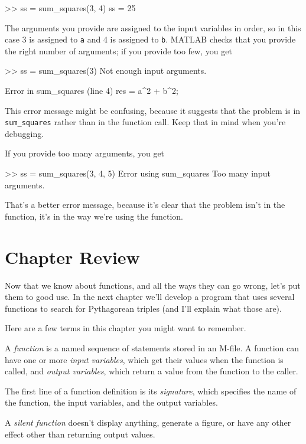 \begin{code}
>> ss = sum_squares(3, 4)
ss = 25
\end{code}

The arguments you provide are assigned to the input variables in
order, so in this case 3 is assigned to \lstinline{a} and 4 is assigned to
\lstinline{b}.  MATLAB checks that you provide the right number of arguments;
if you provide too few, you get

\begin{code}
>> ss = sum_squares(3)
Not enough input arguments.

Error in sum_squares (line 4)
    res = a^2 + b^2;
\end{code}

This error message might be confusing, because it suggests that
the problem is in \lstinline{sum_squares} rather than in the function call.
Keep that in mind when you're debugging.

If you provide too many arguments, you get

\begin{code}
>> ss = sum_squares(3, 4, 5)
Error using sum_squares
Too many input arguments.
\end{code}

That's a better error message, because it's clear that the problem isn't in the function, it's in the way we're using the function.

\section{Chapter Review}

Now that we know about functions, and all the ways they can go wrong, let's put them to good use.  In the next chapter we'll develop a program that uses several functions to search for Pythagorean triples (and I'll explain what those are).

Here are a few terms in this chapter you might want to remember.

A \emph{function} is a named sequence of statements stored in an M-file.
A function can have one or more \emph{input variables}, which get their values when the function is called, and \emph{output variables}, which return a value from the function to the caller.

The first line of a function definition is its \emph{signature}, which
specifies the name of the function, the input variables, and the
output variables.

A \emph{silent function} doesn't display anything, generate a figure, or have any other effect other than returning output values.


